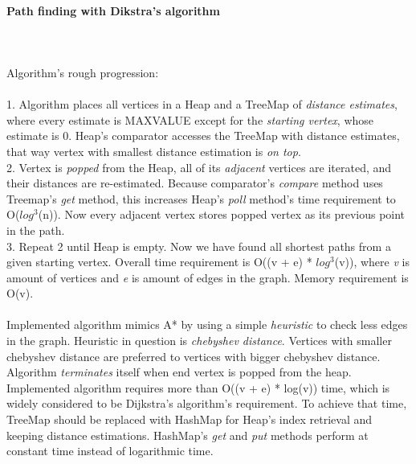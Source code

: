 \documentclass[a4paper,12pt]{article}
\begin{document}
\paragraph{\large Path finding with Dikstra's algorithm} \hspace{0pt} \\
\\
Algorithm's rough progression:\\
\\
1. Algorithm places all vertices in a Heap and a TreeMap of \emph{distance estimates}, where every estimate is MAXVALUE except for the \emph{starting vertex}, whose estimate is 0. Heap's comparator accesses the TreeMap with distance estimates, that way vertex with smallest distance estimation is \emph{on top}.\\
2. Vertex is \emph{popped} from the Heap, all of its \emph{adjacent} vertices are iterated, and their distances are re-estimated. Because comparator's \emph{compare} method uses Treemap's \emph{get} method, this increases Heap's \emph{poll} method's time requirement to O($log^{3}$(n)). Now every adjacent vertex stores popped vertex as its previous point in the path.\\
3. Repeat 2 until Heap is empty. Now we have found all shortest paths from a given starting vertex. Overall time requirement is O((v + e) * $log^{3}$(v)), where \emph{v} is amount of vertices and \emph{e} is amount of edges in the graph. Memory requirement is O(v).\\
\\
Implemented algorithm mimics A* by using a simple \emph{heuristic} to check less edges in the graph. Heuristic in question is \emph{chebyshev distance}. Vertices with smaller chebyshev distance are preferred to vertices with bigger chebyshev distance. Algorithm \emph{terminates} itself when end vertex is popped from the heap.\\
Implemented algorithm requires more than O((v + e) * log(v)) time, which is widely considered to be Dijkstra's algorithm's requirement. To achieve that time, TreeMap should be replaced with HashMap for Heap's index retrieval and keeping distance estimations. HashMap's \emph{get} and \emph{put} methods perform at constant time instead of logarithmic time.
\end{document}
